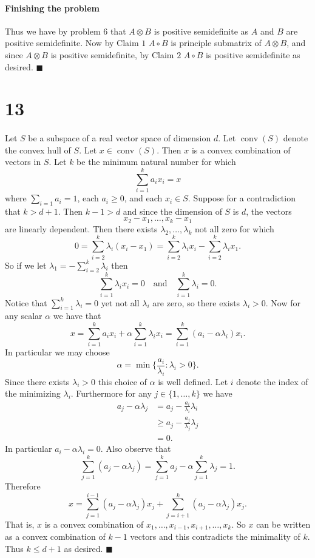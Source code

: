 \documentclass[letterpaper,12pt,oneside,onecolumn]{article}
\DeclareMathOperator{\conv}{conv}
\begin{document}
\paragraph{Finishing the problem}
Thus we have by problem $6$ that $A \otimes B$ is positive semidefinite as $A$ and $B$ are positive semidefinite. Now by Claim $1$ $A \circ B$ is principle submatrix of $A\otimes B$, and since $A \otimes B$ is positive semidefinite, by Claim $2$ $A \circ B$ is positive semidefinite as desired. $\blacksquare$
\section*{13}
\paragraph{}
Let $S$ be a subspace of a real vector space of dimension $d$. Let $\conv(S)$ denote the convex hull of $S$. Let $x \in \conv(S)$. Then $x$ is a convex combination of vectors in $S$. Let $k$ be the minimum natural number for which
$$\sum_{i=1}^k a_i x_i = x$$
where $\sum_{i=1}a_i = 1$, each $a_i \geq 0$, and each $x_i \in S$. Suppose for a contradiction that $k > d+1$. Then $k-1 >d$ and since the dimension of $S$ is $d$, the vectors
$$x_2 - x_1, \dots, x_k -x_1$$
are linearly dependent. Then there exists $\lambda_2, \dots, \lambda_k$ not all zero for which
$$0 = \sum_{i=2}^k \lambda_i (x_i-x_1) = \sum_{i=2}^k \lambda_i x_i - \sum_{i=2}^k\lambda_i x_1.$$
So if we let $\lambda_1 = -\sum_{i=2}^k\lambda_i$ then
$$ \sum_{i=1}^k \lambda_i x_i = 0 \quad\text{and}\quad \sum_{i=1}^k \lambda_i = 0.$$
Notice that $\sum_{i=1}^k \lambda_i = 0$ yet not all $\lambda_i$ are zero, so there exists $\lambda_i >0$. Now for any scalar $\alpha$ we have that
$$x = \sum_{i=1}^k a_i x_i + \alpha \sum_{i=1}^k \lambda_i x_i = \sum_{i=1}^k (a_i - \alpha\lambda_i)x_i.$$
In particular we may choose
$$\alpha = \min\{\frac{a_i}{\lambda_i} : \lambda_i >0\}.$$
Since there exists $\lambda_i >0$ this choice of $\alpha$ is well defined. Let $i$ denote the index of the minimizing $\lambda_i$. Furthermore for any $j \in \{1, \dots, k\}$ we have
\begin{align*}
a_j - \alpha \lambda_j &= a_j - \frac{a_i}{\lambda_i} \lambda_i \\
&\geq a_j - \frac{a_j}{\lambda_j}\lambda_j \\
&= 0.
\end{align*}
In particular $a_i - \alpha \lambda_i = 0$. Also observe that $$\sum_{j=1}^k (a_j - \alpha \lambda_j) = \sum_{j=1}^k a_j - \alpha \sum_{j=1}^k \lambda_j = 1.$$
Therefore $$x = \sum_{j=1}^{i-1} (a_j - \alpha \lambda_j)x_j + \sum_{j=i+1}^{k} (a_j - \alpha \lambda_j)x_j.$$
That is, $x$ is a convex combination of $x_1, \dots, x_{i-1}, x_{i+1}, \dots, x_k$. So $x$ can be written as a convex combination of $k-1$ vectors and this contradicts the minimality of $k$. Thus $k \leq d+1$ as desired. $\blacksquare$
\end{document}
